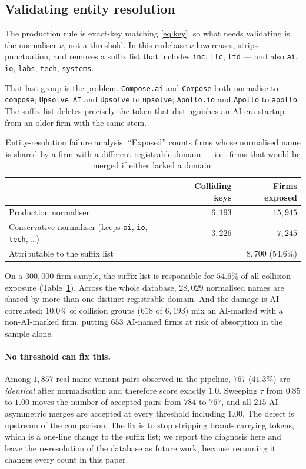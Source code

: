 \documentclass[11pt]{article}
\begin{document}
\subsection{Validating entity resolution}
\label{sec:er_eval}

The production rule is exact-key matching \eqref{eq:key}, so what needs
validating is the normaliser $\nu$, not a threshold. In this codebase $\nu$
lowercases, strips punctuation, and removes a suffix list that includes
\texttt{inc}, \texttt{llc}, \texttt{ltd} --- and also \texttt{ai},
\texttt{io}, \texttt{labs}, \texttt{tech}, \texttt{systems}.

That last group is the problem. \texttt{Compose.ai} and \texttt{Compose} both
normalise to \texttt{compose}; \texttt{Upsolve AI} and \texttt{Upsolve} to
\texttt{upsolve}; \texttt{Apollo.io} and \texttt{Apollo} to \texttt{apollo}.
The suffix list deletes precisely the token that distinguishes an AI-era
startup from an older firm with the same stem.

\begin{table}[htbp]
\centering\small
\caption{Entity-resolution failure analysis. ``Exposed'' counts firms whose
normalised name is shared by a firm with a different registrable domain ---
i.e.\ firms that would be merged if either lacked a domain.}
\label{tab:er}
\begin{tabular}{@{}lrr@{}}
\toprule
& Colliding keys & Firms exposed \\
\midrule
Production normaliser   & $6{,}193$ & $15{,}945$ \\
Conservative normaliser (keeps \texttt{ai}, \texttt{io}, \texttt{tech}, \dots) & $3{,}226$ & $7{,}245$ \\
\midrule
Attributable to the suffix list & & $8{,}700$ \quad ($54.6\%$) \\
\bottomrule
\end{tabular}
\end{table}

On a $300{,}000$-firm sample, the suffix list is responsible for $54.6\%$ of
all collision exposure (Table~\ref{tab:er}). Across the whole database,
$28{,}029$ normalised names are shared by more than one distinct registrable
domain. And the damage is AI-correlated: $10.0\%$ of collision groups
($618$ of $6{,}193$) mix an AI-marked with a non-AI-marked firm, putting $653$
AI-named firms at risk of absorption in the sample alone.

\paragraph{No threshold can fix this.} Among $1{,}857$ real name-variant pairs
observed in the pipeline, $767$ ($41.3\%$) are \emph{identical} after
normalisation and therefore score exactly $1.0$. Sweeping $\tau$ from $0.85$ to
$1.00$ moves the number of accepted pairs from $784$ to $767$, and all $215$
AI-asymmetric merges are accepted at every threshold including $1.00$. The
defect is upstream of the comparison. The fix is to stop stripping brand-
carrying tokens, which is a one-line change to the suffix list; we report the
diagnosis here and leave the re-resolution of the database as future work,
because rerunning it changes every count in this paper.
\end{document}
